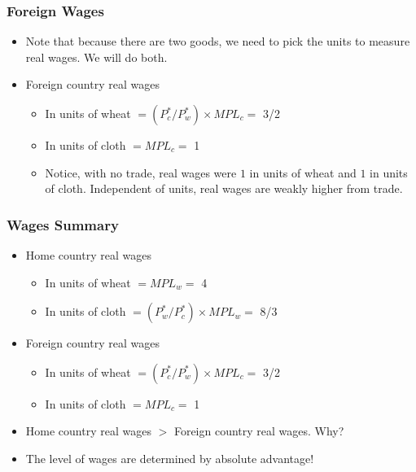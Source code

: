\documentclass[handout]{beamer}
\begin{document}
\begin{frame}[t]
\frametitle{Foreign Wages}
\bigskip
\begin{itemize}
\item Note that because there are two goods, we need to pick the units to measure real wages. We will do both.
\bigskip
\item Foreign country real wages
\begin{itemize}
\medskip
\item In units of wheat $= (P^*_c/P^*_w)\times  MPL_c = $ 3/2
\medskip
\item In units of cloth $ = MPL_c = $ 1
\bigskip
\item {\footnotesize Notice, with no trade, real wages were $1$ in units of wheat and $1$ in units of cloth. Independent of units, real wages are weakly higher from trade.}
\end{itemize}
\end{itemize}
\end{frame}


\begin{frame}[t]
\frametitle{Wages Summary}
\bigskip
\begin{itemize}
\item Home country real wages
\begin{itemize}
\medskip
\item In units of wheat $= MPL_w = $ 4
\medskip
\item In units of cloth $ = (P^*_w/P^*_c)\times MPL_w = $ 8/3
\end{itemize}
\bigskip
\item Foreign country real wages
\begin{itemize}
\medskip
\item In units of wheat $= (P^*_c/P^*_w) \times MPL_c = $ 3/2
\medskip
\item In units of cloth $ = MPL_c = $ 1
\end{itemize}
\bigskip
\item Home country real wages $>$ Foreign country real wages. Why?
\bigskip
\item The level of wages are determined by absolute advantage!
\end{itemize}
\end{frame}
\end{document}
